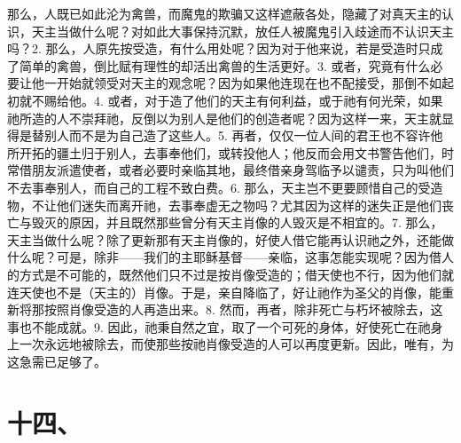 那么，人既已如此沦为禽兽，而魔鬼的欺骗又这样遮蔽各处，隐藏了对真天主的认识，天主当做什么呢？对如此大事保持沉默，放任人被魔鬼引入歧途而不认识天主吗？2. 那么，人原先按受造，有什么用处呢？因为对于他来说，若是受造时只成了简单的禽兽，倒比赋有理性的却活出禽兽的生活更好。3. 或者，究竟有什么必要让他一开始就领受对天主的观念呢？因为如果他连现在也不配接受，那倒不如起初就不赐给他。4. 或者，对于造了他们的天主有何利益，或于祂有何光荣，如果祂所造的人不崇拜祂，反倒以为别人是他们的创造者呢？因为这样一来，天主就显得是替别人而不是为自己造了这些人。5. 再者，仅仅一位人间的君王也不容许他所开拓的疆土归于别人，去事奉他们，或转投他人；他反而会用文书警告他们，时常借朋友派遣使者，或者必要时亲临其地，最终借亲身驾临予以谴责，只为叫他们不去事奉别人，而自己的工程不致白费。6. 那么，天主岂不更要顾惜自己的受造物，不让他们迷失而离开祂，去事奉虚无之物吗？尤其因为这样的迷失正是他们丧亡与毁灭的原因，并且既然那些曾分有天主肖像的人毁灭是不相宜的。7. 那么，天主当做什么呢？除了更新那有天主肖像的，好使人借它能再认识祂之外，还能做什么呢？可是，除非——我们的主耶稣基督——亲临，这事怎能实现呢？因为借人的方式是不可能的，既然他们只不过是按肖像受造的；借天使也不行，因为他们就连天使也不是（天主的）肖像。于是，亲自降临了，好让祂作为圣父的肖像，能重新将那按照肖像受造的人再造出来。8. 然而，再者，除非死亡与朽坏被除去，这事也不能成就。9. 因此，祂秉自然之宜，取了一个可死的身体，好使死亡在祂身上一次永远地被除去，而使那些按祂肖像受造的人可以再度更新。因此，唯有，为这急需已足够了。\par


\section{十四、}

